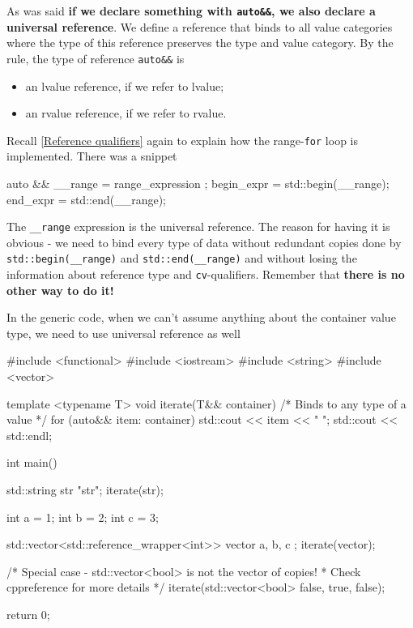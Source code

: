 \documentclass[../main]{subfiles}
\begin{document}
    As was said \textbf{if we declare something with \texttt{auto\&\&}, we also declare a universal reference}.
We define a reference that binds to all value categories where the type of this reference preserves the type and value category. By the rule,
the type of reference \texttt{auto\&\&} is
\begin{itemize}
    \item an lvalue reference, if we refer to lvalue;
    \item an rvalue reference, if we refer to rvalue.
\end{itemize}

    Recall \ref{Reference qualifiers} again to explain how the
range-\texttt{for} loop is implemented. There was a snippet
\begin{Code}
    auto && __range = range_expression ;
    begin_expr = std::begin(__range);
    end_expr = std::end(__range);
\end{Code}
    The \texttt{\_\_range} expression is the universal reference. The reason for having it is obvious - we need to bind every type of data without
redundant copies done by \texttt{std::begin(\_\_range)} and \texttt{std::end(\_\_range)} and without losing the information about reference type
and \texttt{cv}-qualifiers. Remember that \textbf{there is no other way to do it!}\newline

    In the generic code, when we can't assume anything about the container value type, we need to use universal reference as well
\begin{Code}
    #include <functional>
    #include <iostream>
    #include <string>
    #include <vector>
    
    template <typename T>
    void iterate(T&& container)
    {
        /* Binds to any type of a value */
        for (auto&& item: container)
        {
            std::cout << item << " ";
        }
        std::cout << std::endl;
    }
    
    int main()
    {
        std::string str {"str"};
        iterate(str);
        
        int a = 1;
        int b = 2;
        int c = 3;
        
        std::vector<std::reference_wrapper<int>> vector { a, b, c };
        iterate(vector);
    
        /* Special case - std::vector<bool> is not the vector of copies!
         * Check cppreference for more details
         */
        iterate(std::vector<bool> {false, true, false});
        
        return 0;
    }
\end{Code}
\end{document}

